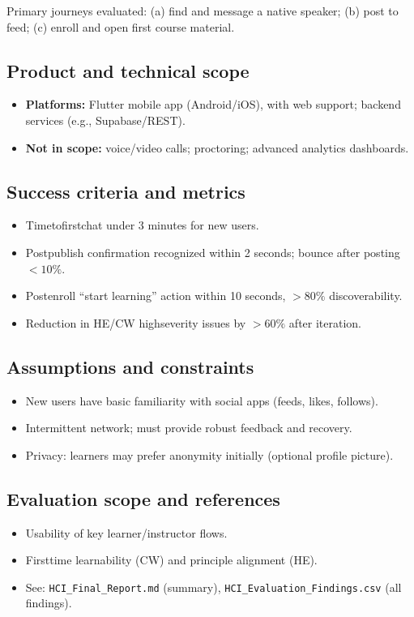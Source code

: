 \documentclass[11pt,a4paper]{article}
\begin{document}
\noindent Primary journeys evaluated: (a) find and message a native speaker; (b) post to feed; (c) enroll and open first course material.

\subsection{Product and technical scope}
\begin{itemize}[leftmargin=*]
  \item \textbf{Platforms:} Flutter mobile app (Android/iOS), with web support; backend services (e.g., Supabase/REST).
  \item \textbf{Not in scope:} voice/video calls; proctoring; advanced analytics dashboards.
\end{itemize}

\subsection{Success criteria and metrics}
\begin{itemize}[leftmargin=*]
  \item Time\-to\-first\-chat under 3 minutes for new users.
  \item Post\-publish confirmation recognized within 2 seconds; bounce after posting $< 10\%$.
  \item Post\-enroll ``start learning'' action within 10 seconds, $> 80\%$ discoverability.
  \item Reduction in HE/CW high\-severity issues by $> 60\%$ after iteration.
\end{itemize}

\subsection{Assumptions and constraints}
\begin{itemize}[leftmargin=*]
  \item New users have basic familiarity with social apps (feeds, likes, follows).
  \item Intermittent network; must provide robust feedback and recovery.
  \item Privacy: learners may prefer anonymity initially (optional profile picture).
\end{itemize}

\subsection{Evaluation scope and references}
\begin{itemize}[leftmargin=*]
  \item Usability of key learner/instructor flows.
  \item First\-time learnability (CW) and principle alignment (HE).
  \item See: \texttt{HCI\_Final\_Report.md} (summary), \texttt{HCI\_Evaluation\_Findings.csv} (all findings).
\end{itemize}
\end{document}
